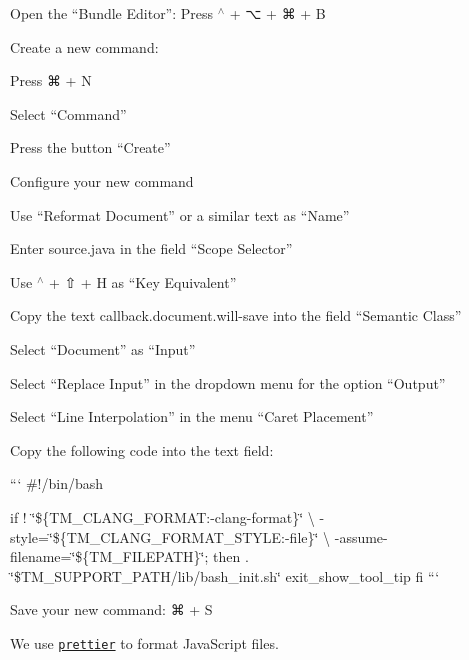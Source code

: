 \begin{DoxyEnumerate}
\item Open the “\+Bundle Editor”\+: Press {\ttfamily $^\wedge$} + {\ttfamily ⌥} + {\ttfamily ⌘} + {\ttfamily B}
\item Create a new command\+:
\begin{DoxyEnumerate}
\item Press {\ttfamily ⌘} + {\ttfamily N}
\item Select “\+Command”
\item Press the button “\+Create”
\end{DoxyEnumerate}
\item Configure your new command
\begin{DoxyEnumerate}
\item Use “\+Reformat Document” or a similar text as “\+Name”
\item Enter {\ttfamily source.\+java} in the field “\+Scope Selector”
\item Use {\ttfamily $^\wedge$} + {\ttfamily ⇧} + {\ttfamily H} as “\+Key Equivalent”
\item Copy the text {\ttfamily callback.\+document.\+will-\/save} into the field “\+Semantic Class”
\item Select “\+Document” as “\+Input”
\item Select “\+Replace Input” in the dropdown menu for the option “\+Output”
\item Select “\+Line Interpolation” in the menu “\+Caret Placement”
\item Copy the following code into the text field\+:

``` \#!/bin/bash

if ! \char`\"{}\$\{\+T\+M\+\_\+\+C\+L\+A\+N\+G\+\_\+\+F\+O\+R\+M\+A\+T\+:-\/clang-\/format\}\char`\"{} \textbackslash{} -\/style=\char`\"{}\$\{\+T\+M\+\_\+\+C\+L\+A\+N\+G\+\_\+\+F\+O\+R\+M\+A\+T\+\_\+\+S\+T\+Y\+L\+E\+:-\/file\}\char`\"{} \textbackslash{} -\/assume-\/filename=\char`\"{}\$\{\+T\+M\+\_\+\+F\+I\+L\+E\+P\+A\+T\+H\}\char`\"{}; then . \char`\"{}\$\+T\+M\+\_\+\+S\+U\+P\+P\+O\+R\+T\+\_\+\+P\+A\+T\+H/lib/bash\+\_\+init.\+sh\char`\"{} exit\+\_\+show\+\_\+tool\+\_\+tip fi ```
\item Save your new command\+: {\ttfamily ⌘} + {\ttfamily S}
\end{DoxyEnumerate}
\end{DoxyEnumerate}

We use \href{https://prettier.io}{\tt {\ttfamily prettier}} to format Java\+Script files.

